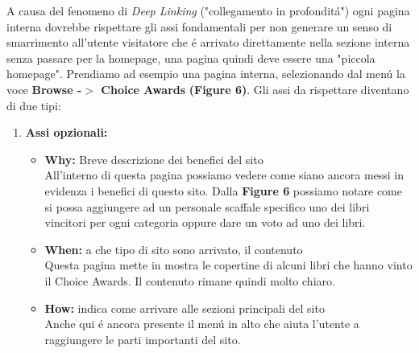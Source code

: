 \documentclass[12pt]{article}
\begin{document}
A causa del fenomeno di \textit{Deep Linking} ("collegamento in profondit\'a") ogni pagina interna dovrebbe rispettare gli assi fondamentali per non generare un senso di smarrimento all'utente visitatore che \'e arrivato direttamente nella sezione interna senza passare per la homepage, una pagina quindi deve essere una "piccola homepage". Prendiamo ad esempio una pagina interna, selezionando dal men\'u la voce \textbf{Browse -$>$ Choice Awards} \textbf{(Figure 6)}. Gli assi da rispettare diventano di due tipi:

\begin{enumerate}

\item {\large \textbf{Assi opzionali:}}
	\begin{itemize}
		\item \textbf{Why:} Breve descrizione dei benefici del sito\\ 
		All'interno di questa pagina possiamo vedere come siano ancora messi in evidenza i benefici di questo sito. Dalla \textbf{Figure 6} possiamo notare come si possa aggiungere ad un personale scaffale specifico uno dei libri vincitori per ogni categoria oppure dare un voto ad uno dei libri.
		\item \textbf{When:} a che tipo di sito sono arrivato, il contenuto\\
		Questa pagina mette in mostra le copertine di alcuni libri che hanno vinto il Choice Awards. Il contenuto rimane quindi molto chiaro.
		\item \textbf{How:} indica come arrivare alle sezioni principali del sito\\
		Anche qui \'e ancora presente il men\'u in alto che aiuta l'utente a raggiungere le parti importanti del sito.		
		
	\end{itemize}		


\end{enumerate}
\end{document}
